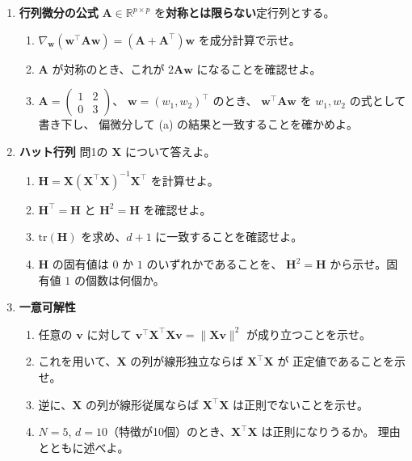 \begin{enumerate}
  \item \textbf{行列微分の公式}\quad
    $\bm{A} \in \mathbb{R}^{p \times p}$ を\textbf{対称とは限らない}定行列とする。
    \begin{enumerate}
      \item $\nabla_{\bm{w}}(\bm{w}^\top\bm{A}\bm{w}) = (\bm{A} + \bm{A}^\top)\bm{w}$
        を成分計算で示せ。
      \item $\bm{A}$ が対称のとき、これが $2\bm{A}\bm{w}$ になることを確認せよ。
      \item $\bm{A} = \begin{pmatrix} 1 & 2 \\ 0 & 3 \end{pmatrix}$、
        $\bm{w} = (w_1, w_2)^\top$ のとき、
        $\bm{w}^\top\bm{A}\bm{w}$ を $w_1, w_2$ の式として書き下し、
        偏微分して (a) の結果と一致することを確かめよ。
    \end{enumerate}

  \item \textbf{ハット行列}\quad
    問1の $\bm{X}$ について答えよ。
    \begin{enumerate}
      \item $\bm{H} = \bm{X}(\bm{X}^\top\bm{X})^{-1}\bm{X}^\top$ を計算せよ。
      \item $\bm{H}^\top = \bm{H}$ と $\bm{H}^2 = \bm{H}$ を確認せよ。
      \item $\mathrm{tr}(\bm{H})$ を求め、$d+1$ に一致することを確認せよ。
      \item $\bm{H}$ の固有値は $0$ か $1$ のいずれかであることを、
        $\bm{H}^2 = \bm{H}$ から示せ。固有値 $1$ の個数は何個か。
    \end{enumerate}

  \item \textbf{一意可解性}\quad
    \begin{enumerate}
      \item 任意の $\bm{v}$ に対して $\bm{v}^\top\bm{X}^\top\bm{X}\bm{v} = \|\bm{X}\bm{v}\|^2$
        が成り立つことを示せ。
      \item これを用いて、$\bm{X}$ の列が線形独立ならば $\bm{X}^\top\bm{X}$ が
        正定値であることを示せ。
      \item 逆に、$\bm{X}$ の列が線形従属ならば $\bm{X}^\top\bm{X}$ は正則でないことを示せ。
      \item $N = 5$, $d = 10$（特徴が10個）のとき、$\bm{X}^\top\bm{X}$ は正則になりうるか。
        理由とともに述べよ。
    \end{enumerate}


\end{enumerate}
